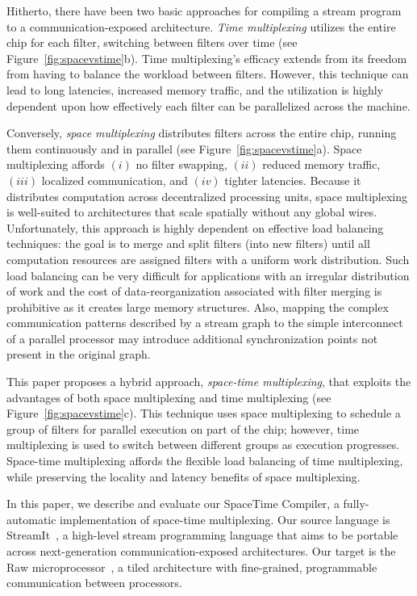Hitherto, there have been two basic approaches for compiling a stream
program to a communication-exposed architecture.  {\it Time
multiplexing} utilizes the entire chip for each filter, switching
between filters over time (see Figure~\ref{fig:spacevstime}b).  Time
multiplexing's efficacy extends from its freedom from having to
balance the workload between filters.  However, this technique can
lead to long latencies, increased memory traffic, and the utilization
is highly dependent upon how effectively each filter can be
parallelized across the machine.

Conversely, {\it space multiplexing} distributes filters across the
entire chip, running them continuously and in parallel (see
Figure~\ref{fig:spacevstime}a).  Space multiplexing affords $(i)$ no
filter swapping, $(ii)$ reduced memory traffic, $(iii)$ localized
communication, and $(iv)$ tighter latencies.  Because it distributes
computation across decentralized processing units, space multiplexing
is well-suited to architectures that scale spatially without any
global wires.  Unfortunately, this approach is highly dependent on
effective load balancing techniques: the goal is to merge and split
filters (into new filters) until all computation resources are
assigned filters with a uniform work distribution.  Such load
balancing can be very difficult for applications with an irregular
distribution of work and the cost of data-reorganization associated
with filter merging is prohibitive as it creates large memory
structures. Also, mapping the complex communication patterns described
by a stream graph to the simple interconnect of a parallel processor
may introduce additional synchronization points not present in the
original graph.

This paper proposes a hybrid approach, {\it space-time multiplexing},
that exploits the advantages of both space multiplexing and time
multiplexing (see Figure~\ref{fig:spacevstime}c).  This technique uses
space multiplexing to schedule a group of filters for parallel
execution on part of the chip; however, time multiplexing is used to
switch between different groups as execution progresses.  Space-time
multiplexing affords the flexible load balancing of time multiplexing,
while preserving the locality and latency benefits of space
multiplexing.

In this paper, we describe and evaluate our SpaceTime Compiler, a
fully-automatic implementation of space-time multiplexing.  Our source
language is StreamIt~\cite{streamitcc}, a high-level stream
programming language that aims to be portable across next-generation
communication-exposed architectures.  Our target is the Raw
microprocessor~\cite{raw10,raw_isca}, a tiled architecture with
fine-grained, programmable communication between processors.

